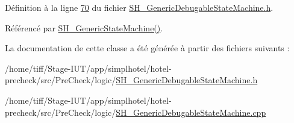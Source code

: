 Définition à la ligne \hyperlink{SH__GenericDebugableStateMachine_8h_source_l00070}{70} du fichier \hyperlink{SH__GenericDebugableStateMachine_8h_source}{S\-H\-\_\-\-Generic\-Debugable\-State\-Machine.\-h}.



Référencé par \hyperlink{classSH__GenericStateMachine_ac34a1ac375e680e27708097c4f099f59}{S\-H\-\_\-\-Generic\-State\-Machine()}.



La documentation de cette classe a été générée à partir des fichiers suivants \-:\begin{DoxyCompactItemize}
\item 
/home/tiff/\-Stage-\/\-I\-U\-T/app/simplhotel/hotel-\/precheck/src/\-Pre\-Check/logic/\hyperlink{SH__GenericDebugableStateMachine_8h}{S\-H\-\_\-\-Generic\-Debugable\-State\-Machine.\-h}\item 
/home/tiff/\-Stage-\/\-I\-U\-T/app/simplhotel/hotel-\/precheck/src/\-Pre\-Check/logic/\hyperlink{SH__GenericDebugableStateMachine_8cpp}{S\-H\-\_\-\-Generic\-Debugable\-State\-Machine.\-cpp}\end{DoxyCompactItemize}
